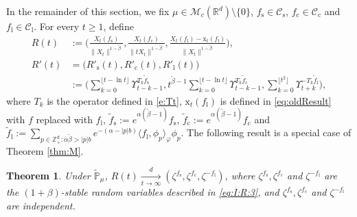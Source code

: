\documentclass[12pt,a4paper]{amsart}
\theoremstyle{plain}
\newtheorem{thm}{Theorem}[section]
\theoremstyle{definition}
\numberwithin{equation}{section}
\begin{document}
	In the remainder of this section, we  fix $\mu \in \mathcal M_c(\mathbb R^d)\setminus\{0\}$, $f_\mathrm s\in \mathcal C_\mathrm s$,  $f_\mathrm c\in \mathcal C_\mathrm c$ and $f_\mathrm l\in \mathcal C_\mathrm l$.
	For every $t\geq 1$, define
\begin{align}
	R(t)
	&:=\Big( \frac{X_t(f_\mathrm s)}{\|X_t\|^{1-\tilde \beta}},\frac{X_t(f_\mathrm c)}{\|tX_t\|^{1-\tilde \beta}},\frac{ X_t(f_\mathrm l) - \mathrm x_t(f_\mathrm l)}{\|X_t\|^{1-\tilde \beta}}\Big),
        \\R'(t)
    &=\big(R'_\mathrm s(t), R'_\mathrm c(t), R'_\mathrm l(t)\big)
        \\& :=\Big(\sum_{k=0}^{\lfloor t-\ln t \rfloor} \Upsilon_{t-k-1}^{T_k \tilde f_\mathrm s},t^{\tilde \beta - 1}\sum_{k=0}^{\lfloor t-\ln t \rfloor} \Upsilon_{t-k-1}^{T_{k} \tilde f_\mathrm c},\sum_{k = 0}^{\lfloor t^2 \rfloor} \Upsilon_{t+k}^{- T_k \tilde f_\mathrm l}\Big),
\end{align}
where $T_k$ is the operator defined in 
\eqref{e:Tt}, $\mathrm x_t(f_\mathrm l)$ is defined in \eqref{eq:oldResult} 
with $f$ replaced with $f_\mathrm l$, $\tilde f_\mathrm s:=e^{\alpha(\tilde \beta - 1)} f_\mathrm s$, $\tilde f_\mathrm c:=e^{\alpha(\tilde \beta - 1)} f_\mathrm c$ and $\tilde f_\mathrm l := \sum_{p\in \mathbb Z^d_+: \alpha\tilde\beta>|p|b}e^{-(\alpha - |p|b)}\langle f_\mathrm l, \phi_p \rangle_\varphi \phi_p$.
	The following result is a special case of Theorem \ref{thm:M}.
\begin{thm}\label{thm: II}
	Under $\mathbb{\widetilde{P}}_{\mu}$, $R(t) \xrightarrow[t\rightarrow\infty]{d}(\zeta^{f_\mathrm s},\zeta^{f_\mathrm c},\zeta^{-f_\mathrm l})$, where $\zeta^{f_\mathrm s},\zeta^{f_\mathrm c}$ and $\zeta^{-f_\mathrm l}$ are the $(1+\beta)$-stable random variables described in \eqref{eq:I:R:3}, and $\zeta^{f_\mathrm s},\zeta^{f_\mathrm c}$ and $\zeta^{-f_\mathrm l}$ are independent.
\end{thm}
\end{document}
